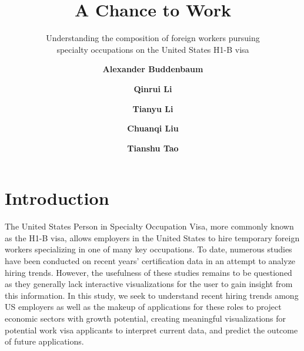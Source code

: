 \documentclass[sigconf]{acmart}
\begin{document}
\title{A Chance to Work}
\subtitle{Understanding the composition of foreign workers 
pursuing \\specialty occupations on the United States H1-B visa
}


\author{\textbf{Alexander Buddenbaum}}

\author{\textbf{Qinrui Li}}

\author{\textbf{Tianyu Li}}


\author{\textbf{Chuanqi Liu}}

\author{\textbf{Tianshu Tao}}



\maketitle
\pagestyle{plain}
\section{Introduction}


The United States Person in Specialty Occupation Visa, more commonly known as the H1-B visa, 
allows employers in the United States to hire temporary foreign workers specializing in one of many key occupations.  
To date, numerous studies have been conducted on recent years’ certification data in an attempt to analyze hiring trends. 
However, the usefulness of these studies remains to be questioned as they generally lack interactive visualizations for the user to gain 
insight from this information. In this study, we seek to understand recent hiring trends among US employers as well as the makeup of 
applications for these roles to project economic sectors with growth potential, creating meaningful visualizations for potential work 
visa applicants to interpret current data, and predict the outcome of future applications.
\end{document}
